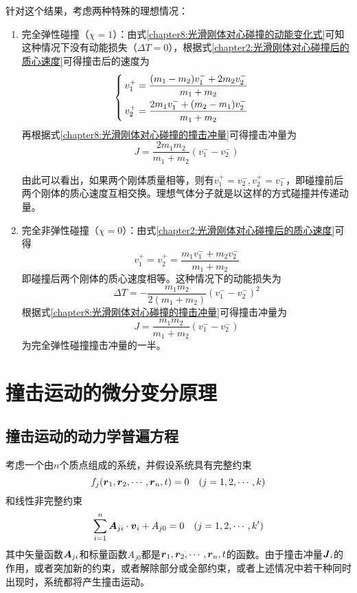 针对这个结果，考虑两种特殊的理想情况：
\begin{enumerate}
\item 完全弹性碰撞（$\chi=1$）：由式\eqref{chapter8:光滑刚体对心碰撞的动能变化式}可知这种情况下没有动能损失（$\Delta T=0$），根据式\eqref{chapter2:光滑刚体对心碰撞后的质心速度}可得撞击后的速度为
\begin{equation}
\begin{cases}
	\displaystyle v_1^+ = \frac{(m_1-m_2)v_1^-+2m_2v_2^-}{m_1+m_2} \\[1.5ex]
	\displaystyle v_2^+ = \frac{2m_1v_1^-+(m_2-m_1)v_2^-}{m_1+m_2}
\end{cases}
\end{equation}
再根据式\eqref{chapter8:光滑刚体对心碰撞的撞击冲量}可得撞击冲量为
\begin{equation}
	J = \frac{2m_1m_2}{m_1+m_2}(v_1^--v_2^-)
\end{equation}

由此可以看出，如果两个刚体质量相等，则有$v_1^+=v_2^-, v_2^+=v_1^-$，即碰撞前后两个刚体的质心速度互相交换。理想气体分子就是以这样的方式碰撞并传递动量。

\item 完全非弹性碰撞（$\chi=0$）：由式\eqref{chapter2:光滑刚体对心碰撞后的质心速度}可得
\begin{equation}
	v_1^+=v_2^+ =\frac{m_1v_1^-+m_2v_2^-}{m_1+m_2}
\end{equation}
即碰撞后两个刚体的质心速度相等。这种情况下的动能损失为
\begin{equation}
	\Delta T = -\frac{m_1m_2}{2(m_1+m_2)}(v_1^--v_2^-)^2
\end{equation}
根据式\eqref{chapter8:光滑刚体对心碰撞的撞击冲量}可得撞击冲量为
\begin{equation}
	J = \frac{m_1m_2}{m_1+m_2}(v_1^--v_2^-)
\end{equation}
为完全弹性碰撞撞击冲量的一半。
\end{enumerate}

\section{撞击运动的微分变分原理}

\subsection{撞击运动的动力学普遍方程}

考虑一个由$n$个质点组成的系统，并假设系统具有完整约束
\begin{equation}
	f_j(\boldsymbol{r}_1,\boldsymbol{r}_2,\cdots,\boldsymbol{r}_n,t) = 0\quad (j=1,2,\cdots,k)
	\label{chapter8:完整约束-重写}
\end{equation}
和线性非完整约束
\begin{equation}
	\sum_{i=1}^n \boldsymbol{A}_{ji}\cdot \boldsymbol{v}_i + A_{j0} = 0\quad (j=1,2,\cdots,k')
	\label{chapter8:线性非完整约束-重写}
\end{equation}
其中矢量函数$\boldsymbol{A}_{ji}$和标量函数$A_{j0}$都是$\boldsymbol{r}_1,\boldsymbol{r}_2,\cdots,\boldsymbol{r}_n,t$的函数。由于撞击冲量$\boldsymbol{J}_i$的作用，或者突加新的约束，或者解除部分或全部约束，或者上述情况中若干种同时出现时，系统都将产生撞击运动。

